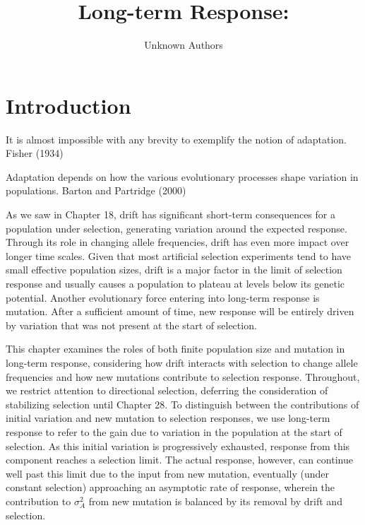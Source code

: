 \documentclass{article}
\title{Long-term Response:}
\author{Unknown Authors}
\date{}
\begin{document}
\maketitle

\begin{abstract}

\end{abstract}

\section{Introduction}
It is almost impossible with any brevity to exemplify the notion of adaptation. Fisher (1934)

Adaptation depends on how the various evolutionary processes shape variation in populations.
Barton and Partridge (2000)

As we saw in Chapter 18, drift has significant short-term consequences for a population under selection, generating variation around the expected response. Through its role in changing allele frequencies, drift has even more impact over longer time scales. Given that most artificial selection experiments tend to have small effective population sizes, drift is a major factor in the limit of selection response and usually causes a population to plateau at levels below its genetic potential. Another evolutionary force entering into long-term response is mutation. After a sufficient amount of time, new response will be entirely driven by variation that was not present at the start of selection.

This chapter examines the roles of both finite population size and mutation in long-term response, considering how drift interacts with selection to change allele frequencies and how new mutations contribute to selection response. Throughout, we restrict attention to directional selection, deferring the consideration of stabilizing selection until Chapter 28. To distinguish between the contributions of initial variation and new mutation to selection responses, we use long-term response to refer to the gain due to variation in the population at the start of selection. As this initial variation is progressively exhausted, response from this component reaches a selection limit. The actual response, however, can continue well past this limit due to the input from new mutation, eventually (under constant selection) approaching an asymptotic rate of response, wherein the contribution to  $ \sigma_A^2 $ from new mutation is balanced by its removal by drift and selection.
\end{document}
